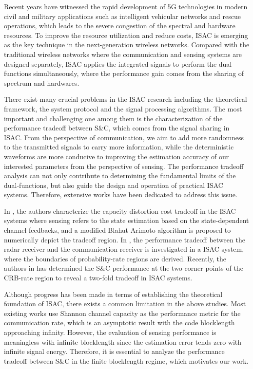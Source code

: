 \documentclass[conference,a4paper]{IEEEtran}
\begin{document}
Recent years have witnessed the rapid development of 5G technologies in modern civil and military applications such as intelligent vehicular networks and rescue operations, which leads to the severe congestion of the spectral and hardware resources\cite{HugKawSim:J15}. To improve the resource utilization and reduce costs, ISAC is emerging as the key technique in the next-generation wireless networks\cite{LiuCuiMas:J22,StuWie:J11}. Compared with the traditional wireless networks where the communication and sensing systems are designed separately, ISAC applies the 
integrated signals to perform the dual-functions simultaneously, where the performance gain comes from the sharing of spectrum and hardwares. 

There exist many crucial problems in the ISAC research including the theoretical framework, the system protocol and the signal processing algorithms. The most important and challenging one among them is the characterization of the performance tradeoff between S\&C, which comes from the signal sharing in ISAC\cite{ZhaRahWu:J21}. From the perspective of communication, we aim to add more randomness to the transmitted signals to carry more information, while the deterministic waveforms are more conducive to improving the estimation accuracy of our interested parameters from the perspective of sensing. The performance tradeoff analysis can not only contribute to determining the fundamental limits of the dual-functions, but also guide the design and operation of practical ISAC systems. Therefore, extensive works have been dedicated to address this issue.

In \cite{AhmKobWig:J22}, the authors characterize the capacity-distortion-cost tradeoff in the ISAC systems where sensing refers to the state estimation based on the state-dependent channel feedbacks, and a modified Blahut-Arimoto algorithm is proposed to numerically depict the tradeoff region. In \cite{ChaMoeHim:J17}, the performance tradeoff between the radar receiver and the communication receiver is investigated in a ISAC system, where the boundaries of probability-rate regions are derived. Recently, the authors in \cite{XioLiuCui:J22} has determined the S\&C performance at the two corner points of the CRB-rate region to reveal a two-fold tradeoff in ISAC systems.

Although progress has been made in terms of establishing the theoretical foundation of ISAC, there exists a common limitation in the above studies. Most existing works use Shannon channel capacity as the performance metric for the communication rate, which is an asymptotic result with the code blocklength approaching infinity. However, the evaluation of sensing performance is meaningless with infinite blocklength since the estimation error tends zero with infinite signal energy. Therefore, it is essential to analyze the performance tradeoff between S\&C in the finite blocklength regime, which motivates our work.
\end{document}
